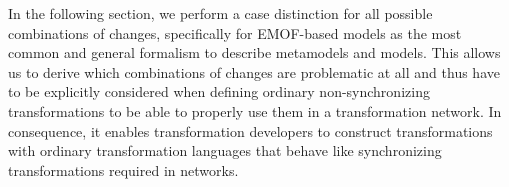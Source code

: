 In the following section, we perform a case distinction for all possible combinations of changes, specifically for EMOF-based models as the most common and general formalism to describe metamodels and models.
This allows us to derive which combinations of changes are problematic at all and thus have to be explicitly considered when defining ordinary non-synchronizing transformations to be able to properly use them in a transformation network.
In consequence, it enables transformation developers to construct transformations with ordinary transformation languages that behave like synchronizing transformations required in networks.






